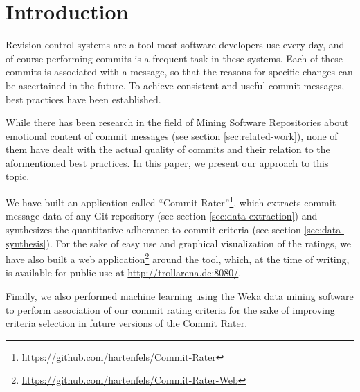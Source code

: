 \section{Introduction}
\label{sec:introduction}

%
%
%
%
%
%

Revision control systems are a tool most software developers use every day, and of course performing commits is a frequent task in these systems. Each of these commits is associated with a message, so that the reasons for specific changes can be ascertained in the future\cite{CB}. To achieve consistent and useful commit messages, best practices have been established\cite{OffGuide,CB,TP,SR}.

While there has been research in the field of Mining Software Repositories about emotional content of commit messages (see section \ref{sec:related-work}), none of them have dealt with the actual quality of commits and their relation to the aformentioned best practices. In this paper, we present our approach to this topic.

We have built an application called ``Commit Rater''\footnote{\url{https://github.com/hartenfels/Commit-Rater}}, which extracts commit message data of any Git repository (see section \ref{sec:data-extraction}) and synthesizes the quantitative adherance to commit criteria (see section \ref{sec:data-synthesis}). For the sake of easy use and graphical visualization of the ratings, we have also built a web application\footnote{\url{https://github.com/hartenfels/Commit-Rater-Web}} around the tool, which, at the time of writing, is available for public use at \url{http://trollarena.de:8080/}.

Finally, we also performed machine learning using the Weka data mining software\cite{Weka} to perform association of our commit rating criteria for the sake of improving criteria selection in future versions of the Commit Rater.

